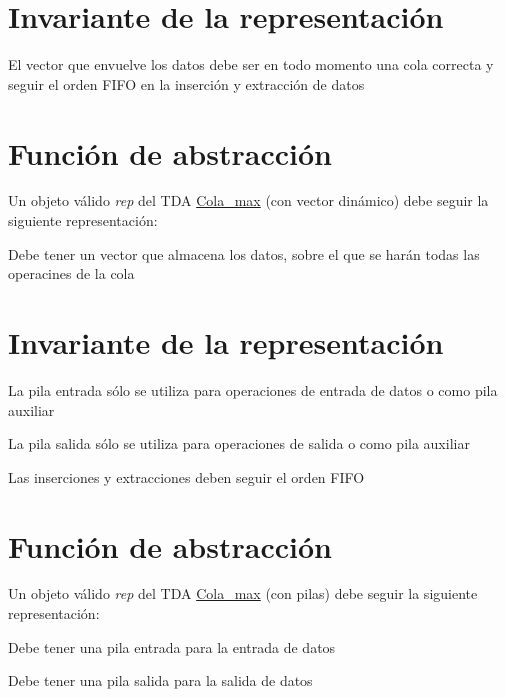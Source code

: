 \hypertarget{repCola_max_invCola_max}{}\section{Invariante de la representación}\label{repCola_max_invCola_max}

\begin{DoxyItemize}
\item El vector que envuelve los datos debe ser en todo momento una cola correcta y seguir el orden F\+I\+FO en la inserción y extracción de datos 
\end{DoxyItemize}\hypertarget{repCola_max_faCola_max}{}\section{Función de abstracción}\label{repCola_max_faCola_max}
Un objeto válido {\itshape rep} del T\+DA \hyperlink{classCola__max}{Cola\+\_\+max} (con vector dinámico) debe seguir la siguiente representación\+:
\begin{DoxyItemize}
\item Debe tener un vector que almacena los datos, sobre el que se harán todas las operacines de la cola
\end{DoxyItemize}\hypertarget{repCola_max_invCola_max}{}\section{Invariante de la representación}\label{repCola_max_invCola_max}

\begin{DoxyItemize}
\item La pila entrada sólo se utiliza para operaciones de entrada de datos o como pila auxiliar
\item La pila salida sólo se utiliza para operaciones de salida o como pila auxiliar
\item Las inserciones y extracciones deben seguir el orden F\+I\+FO 
\end{DoxyItemize}\hypertarget{repCola_max_faCola_max}{}\section{Función de abstracción}\label{repCola_max_faCola_max}
Un objeto válido {\itshape rep} del T\+DA \hyperlink{classCola__max}{Cola\+\_\+max} (con pilas) debe seguir la siguiente representación\+:
\begin{DoxyItemize}
\item Debe tener una pila entrada para la entrada de datos
\item Debe tener una pila salida para la salida de datos 
\end{DoxyItemize}